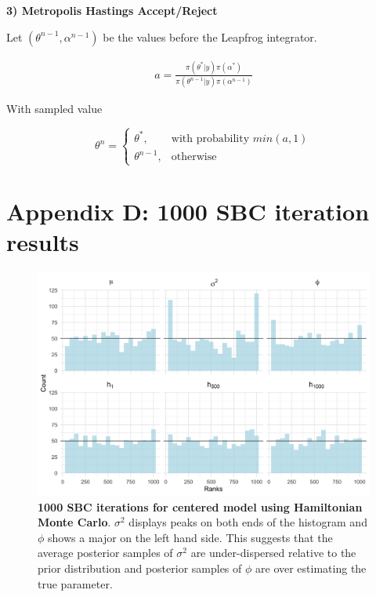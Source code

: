 \documentclass[12pt, a4paper]{article}
\begin{document}
\textbf{3) Metropolis Hastings Accept/Reject}

Let $(\theta^{n-1}, \alpha^{n-1})$ be the values before the Leapfrog integrator.

$$
\begin{aligned}
a = \frac{\pi(\theta^{\ast} | y) \pi(\alpha^{\ast})}{\pi(\theta^{n-1} | y) \pi(\alpha^{n-1})}
\end{aligned}
$$

With sampled value

$$
\theta^n = \begin{cases}
    \theta^{\ast},& \text{with probability } min(a,1)\\
    \theta^{n-1}, & \text{otherwise}
\end{cases}
$$

\section{Appendix D: 1000 SBC iteration results}

    \begin{figure}[H]
        \centering
        \includegraphics[scale=0.09]{results/hmc_cp_1k.png}
        \caption{\textbf{1000 SBC iterations for centered model using Hamiltonian Monte Carlo}. $\sigma^2$ displays peaks on both ends of the histogram and $\phi$ shows a major on the left hand side. This suggests that the average posterior samples of $\sigma^2$ are under-dispersed relative to the prior distribution and posterior samples of $\phi$ are over estimating the true parameter.}
        \label{fig:cphmc1k}
    \end{figure} 
\end{document}
